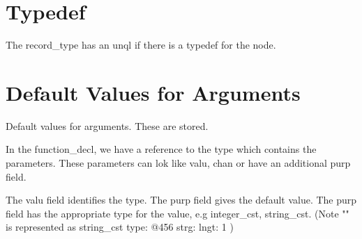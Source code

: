 
\section{Typedef}

The record_type has an unql if there is a typedef for the 
node.

\section{Default Values for Arguments}

Default values for arguments.
These are stored.

In the function_decl, we have a reference to 
the type which contains the parameters.
These parameters can lok like
 valu, chan
or have an additional purp field.

The valu field identifies the type.
The purp field gives the default value.
The purp field has the appropriate type
for the value, e.g integer_cst, string_cst.
(Note "" is represented as
   string_cst       type: @456    strg:          lngt: 1      
)

 